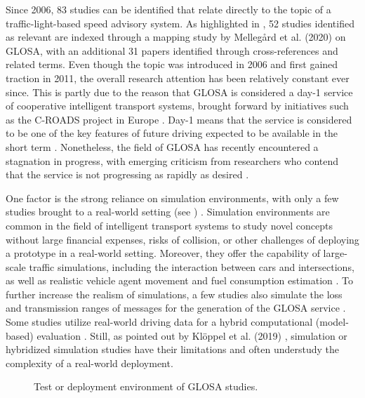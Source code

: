 Since 2006, 83 studies can be identified that relate directly to the topic of a traffic-light-based speed advisory system. As highlighted in , 52 studies identified as relevant are indexed through a mapping study by Mellegård et al. (2020) \cite{mellegard_day_2020} on GLOSA, with an additional 31 papers identified through cross-references and related terms. Even though the topic was introduced in 2006 and first gained traction in 2011, the overall research attention has been relatively constant ever since. This is partly due to the reason that GLOSA is considered a day-1 service of cooperative intelligent transport systems, brought forward by initiatives such as the C-ROADS project in Europe \cite{sharara_impact_2019}. Day-1 means that the service is considered to be one of the key features of future driving expected to be available in the short term \cite{mellegard_day_2020}. Nonetheless, the field of GLOSA has recently encountered a stagnation in progress, with emerging criticism from researchers who contend that the service is not progressing as rapidly as desired \cite{mellegard_day_2020, otto_framework_2023}.

One factor is the strong reliance on simulation environments, with only a few studies brought to a real-world setting (see ) \cite{mellegard_day_2020}. Simulation environments are common in the field of intelligent transport systems to study novel concepts without large financial expenses, risks of collision, or other challenges of deploying a prototype in a real-world setting. Moreover, they offer the capability of  large-scale traffic simulations, including the interaction between cars and intersections, as well as realistic vehicle agent movement and fuel consumption estimation \cite{kloeppel_performance_2019, pariota_green_2019}. To further increase the realism of simulations, a few studies also simulate the loss and transmission ranges of messages for the generation of the GLOSA service \cite{sharara_impact_2019}. Some studies utilize real-world driving data for a hybrid computational (model-based) evaluation \cite{raubitschek_predictive_2011, luo_green_2017, xie_dynamic_2021, bhattacharyya_assessing_2022}. Still, as pointed out by Klöppel et al. (2019) \cite{kloeppel_performance_2019}, simulation or hybridized simulation studies have their limitations and often understudy the complexity of a real-world deployment.

\begin{figure}
\centering
\resizebox{\linewidth}{!}{%

}
\caption{Test or deployment environment of GLOSA studies.}
\label{fig:related-work-piechart}
\end{figure}

